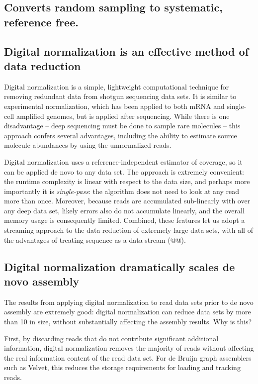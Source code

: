 \documentclass[10pt]{article}
\begin{document}
\subsection*{Converts random sampling to systematic, reference free.}

\subsection*{Digital normalization is an effective method of data reduction}

Digital normalization is a simple, lightweight computational technique
for removing redundant data from shotgun sequencing data sets.  It is
similar to experimental normalization, which has been applied to both
mRNA and single-cell amplified genomes, but is applied after
sequencing.  While there is one disadvantage -- deep sequencing must
be done to sample rare molecules -- this approach confers several
advantages, including the ability to estimate source molecule abundances by
using the unnormalized reads.

Digital normalization uses a reference-independent estimator of
coverage, so it can be applied de novo to any data set.  The approach
is extremely convenient: the runtime complexity is linear with respect
to the data size, and perhaps more importantly it is {\em
single-pass}: the algorithm does not need to look at any read more
than once.  Moreover, because reads are accumulated sub-linearly with
over any deep data set, likely errors also do not accumulate linearly,
and the overall memory usage is consequently limited.  Combined, these
features let us adopt a streaming approach to the data reduction of
extremely large data sets, with all of the advantages of treating
sequence as a data stream (@@).

\subsection*{Digital normalization dramatically scales de novo assembly}

The results from applying digital normalization to read data sets
prior to de novo assembly are extremely good: digital normalization
can reduce data sets by more than 10 in size, without substantially
affecting the assembly results.  Why is this?

First, by discarding reads that do not contribute significant
additional information, digital normalization removes the majority of
reads without affecting the real information content of the read data
set.  For de Bruijn graph assemblers such as Velvet, this reduces the
storage requirements for loading and tracking reads.
\end{document}

